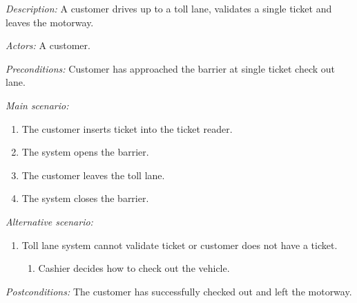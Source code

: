 \textit{Description: } A customer drives up to a toll lane, validates a single ticket and leaves the motorway. 

\textit{Actors:} A customer.

\textit{Preconditions: } Customer has approached the barrier at single ticket check out lane. 

\textit{Main scenario: }
\begin{enumerate}
\item The customer inserts ticket into the ticket reader.
\item The system opens the  barrier.
\item The customer leaves the toll lane.
\item The system closes the barrier.
\end{enumerate}
\textit{Alternative scenario:}
\begin{enumerate}
\item Toll lane system cannot validate ticket or customer does not have a ticket.
\begin{enumerate}
\item Cashier decides how to check out the vehicle.
\end{enumerate}
\end{enumerate}
\textit{Postconditions:}
The customer has successfully checked out and left the motorway.
